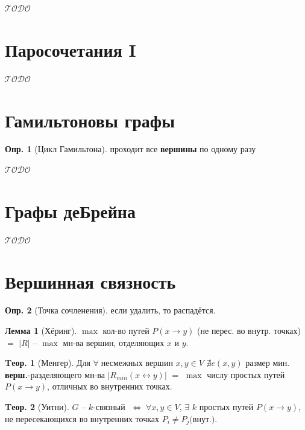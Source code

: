 \documentclass[a4paper,12pt]{article}
\numberwithin{figure}{section}
\theoremstyle{definition}
\newtheorem{definition}{Опр.}[section]
\theoremstyle{definition}
\newtheorem{theorem}{Tеор.}[section]
\newtheorem{lemma}{Лемма}[section]
\def\iiff{$\;\Longleftrightarrow\;$}
\def\iiany{$\forall\;$}
\def\iiTODO{\guillemotleft$\mathcal{TODO}$\guillemotright\textellipsis}
\begin{document}
\iiTODO



\section{Паросочетания I}

\iiTODO



\section{Гамильтоновы графы}

\begin{definition}[Цикл Гамильтона] проходит все \textbf{вершины} по одному разу \end{definition}

\iiTODO



\section{Графы деБрейна}

\iiTODO



\section{Вершинная связность}

\begin{definition}[Точка сочленения] если удалить, то распадётся.\end{definition}

\begin{lemma}[Хёринг]
	$\max$ кол-во путей $P(x \rightarrow y)$ (не перес. во внутр. точках) $=$ $|R|$ -- $\max$ мн-ва вершин, отделяющих $x$ и $y$.
\end{lemma}

\begin{theorem}[Менгер]
	Для \iiany несмежных вершин $x,y \in V$ $\nexists e(x,y)$ размер мин. \textbf{верш.}-разделяющего мн-ва $|R_{min}(x \leftrightarrow y)|$ $=$ $\max$ числу простых путей $P(x \rightarrow y)$, отличных во внутренних точках.
\end{theorem}

\begin{theorem}[Уитни]
	$G$ -- $k$-связный \iiff $\forall x,y \in V$, $\exists$ $k$ простых путей $P(x \rightarrow y)$, не пересекающихся во внутренних точках $P_i \neq P_j \text{(внут.)}$.
\end{theorem}
\end{document}
